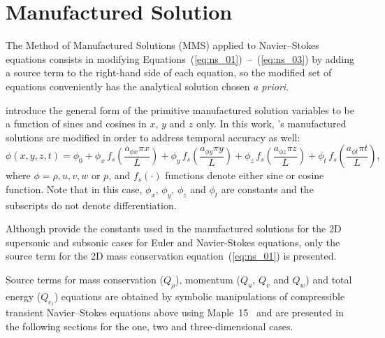 \documentclass[10pt]{article}
\begin{document}
\section{Manufactured Solution}

The Method of Manufactured Solutions (MMS) applied to Navier--Stokes equations consists in modifying Equations~(\ref{eq:ns_01})~--~(\ref{eq:ns_03}) by adding a source term to the right-hand side of each equation, so the modified set of equations conveniently has the analytical solution chosen \textit{a priori}.

\citet{Roy2002} introduce the general form of the primitive manufactured solution variables to be  a function of sines and cosines in $x$, $y$ and $z$ only. In this work, \citet{Roy2002}'s manufactured solutions are modified in order to address temporal accuracy as well:
\begin{equation}
 \label{eq:manufactured01}
  \phi (x,y,z,t) = \phi_0+ \phi_x\, f_s \left(\frac{a_{\phi x} \pi x}{L} \right) +  \phi_y \,f_s\left(\frac{a_{\phi y} \pi y}{L}\right) + \phi_z \,f_s\left(\frac{a_{\phi z} \pi z}{L}\right)+ \phi_t \,f_s\left(\frac{a_{\phi t} \pi t}{L}\right),
\end{equation}
where $\phi=\rho,u,v,w$ or $p$, and $f_s(\cdot)$ functions denote either sine or cosine function. Note that in this case, $\phi_x$, $\phi_y$, $\phi_z$  and $\phi_t$ are constants  and the subscripts do not denote differentiation.



Although \citet{Roy2002} provide the constants used in the manufactured solutions for the 2D supersonic and subsonic cases for Euler and Navier-Stokes equations, only the source term for the 2D mass conservation equation~(\ref{eq:ns_01}) is presented.


Source terms  for mass conservation ($Q_\rho$), momentum ($Q_u$, $Q_v$ and $Q_w$)  and total energy ($Q_{e_t}$) equations are obtained by symbolic manipulations of compressible transient Navier--Stokes equations above using Maple~15~\citep{Maple15} and are presented in the following sections for the one, two and three-dimensional cases.
\end{document}
